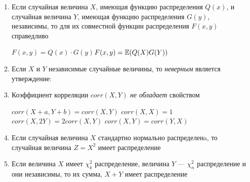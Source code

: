 \documentclass[12pt, a4paper]{article}\usepackage[]{graphicx}\usepackage[]{color}
\begin{document}
\begin{enumerate}
					\item Если случайная величина $X$, имеющая функцию распределения $Q(x)$, и случайная величина $Y$, имеющая функцию распределения $G(y)$, независимы, то для их совместной функции распределения  $F(x,y)$ справедливо

					{$F(x,y)=Q(x)\cdot G(y)$}{$F(x,y)=\mathbb{E}(Q(X)G(Y))$}

					\item Если $X$ и $Y$ независимые случайные величины, то \emph{неверным} является утверждение:




					\item Коэффициент корреляции $corr(X,Y)$ \emph{не обладает} свойством

					{$corr(X+a,Y+b)=corr(X,Y)$}
					{$corr(X,X)=1$}
					{$corr(X,2Y)=2corr(X,Y)$}
					{$corr(X,Y)= corr(Y,X)$}



					\item Если случайная величина $X$ стандартно нормально распределенa, то случайная величина $Z=X^2$ имеет распределение


					\item Если величина $X$ имеет $\chi^2_k$ распределение, величина $Y$ — $\chi^2_n$ распределение и они независимы, то их сумма, $X+Y$ имеет распределение


\end{enumerate}
\end{document}
